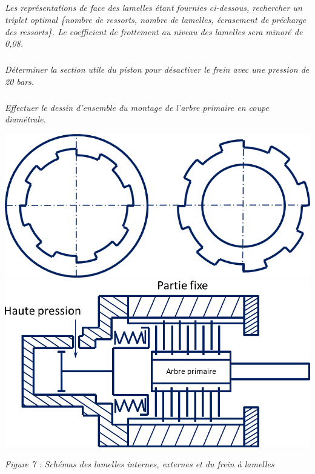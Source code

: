 \documentclass[10pt]{article}
\newif\ifprof
\begin{document}
\subparagraph{}
\textit{Les représentations de face des lamelles étant fournies ci-dessous, rechercher un triplet optimal \{nombre de ressorts, nombre de lamelles, écrasement de précharge des ressorts\}. Le coefficient de frottement au niveau des lamelles sera minoré de 0,08.}

\ifprof
\begin{corrige}
Adoptons un couple de frottement de 0,12 entre les lamelles. Si on opte pour 20 lamelles, il y a $n=21$ surfaces frottantes. On a alors $fn\dfrac{2}{3} \dfrac{R^3-r^3}{R^2-r^2} = 0,12\cdot 21 \cdot \dfrac{2}{3} \cdot\dfrac{37,5^3-25^3}{37,5^2-25^2}=0,0798$. L'effort a fournir est donc de 2 358 N.

Les ressorts ont une raideur de 40 N/mm. On a donc une longueur de ressort nécessaire de 59 mm. Il est donc possible d'utiliser 6 ressorts en parallèles avec une longueur d'écrasement  de 10 mm.
 
\end{corrige}
\else
\fi

\subparagraph{}
\textit{Déterminer la section utile du piston pour désactiver le frein avec une pression de 20 bars.}

\ifprof
\begin{corrige}
Pour désactiver le frein, 5 MPa sont nécessaires. La section de piston nécessaire est donc $S = \dfrac{F}{P} \simeq 48\,  \text{mm}^2 $ 
\end{corrige}
\else
\fi

\subparagraph{}
\textit{Effectuer le dessin d'ensemble du montage de l'arbre primaire en coupe diamétrale.}

\ifprof
\begin{corrige}
\end{corrige}
\else
\fi


\begin{center}
\includegraphics[width=.4\textwidth]{images/lamelles}\hfill
\includegraphics[width=.45\textwidth]{images/frein}

\textit{Figure 7 : Schémas des lamelles internes, externes et du frein à lamelles}
\end{center}
\end{document}
